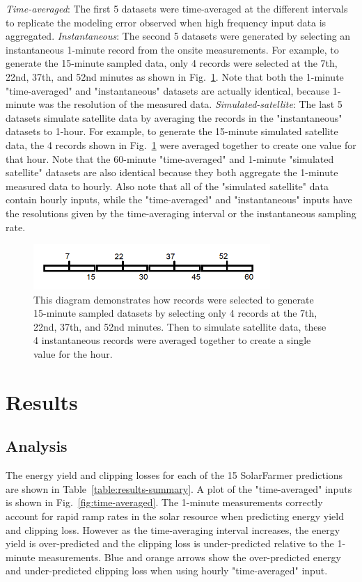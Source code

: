 \documentclass[conference]{IEEEtran}
\begin{document}
\emph{Time-averaged}: The first 5 datasets were time-averaged at the different intervals to replicate the modeling error observed when high frequency input data is aggregated. \emph{Instantaneous}: The second 5 datasets were generated by selecting an instantaneous 1-minute record from the onsite measurements. For example, to generate the 15-minute sampled data, only 4 records were selected at the 7th, 22nd, 37th, and 52nd minutes as shown in Fig.~\ref{fig:sampling-diagram}. Note that both the 1-minute "time-averaged" and "instantaneous" datasets are actually identical, because 1-minute was the resolution of the measured data. \emph{Simulated-satellite}: The last 5 datasets simulate satellite data by averaging the records in the "instantaneous" datasets to 1-hour. For example, to generate the 15-minute simulated satellite data, the 4 records shown in Fig.~\ref{fig:sampling-diagram} were averaged together to create one value for that hour. Note that the 60-minute "time-averaged" and 1-minute "simulated satellite" datasets are also identical because they both aggregate the 1-minute measured data to hourly. Also note that all of the "simulated satellite" data contain hourly inputs, while the "time-averaged" and "instantaneous" inputs have the resolutions given by the time-averaging interval or the instantaneous sampling rate.

\begin{figure}[htbp]
\centerline{\includegraphics[width=9cm]{sampling-diagram.png}}
\caption{This diagram demonstrates how records were selected to generate 15-minute sampled datasets by selecting only 4 records at the 7th, 22nd, 37th, and 52nd minutes. Then to simulate satellite data, these 4 instantaneous records were averaged together to create a single value for the hour.}
\label{fig:sampling-diagram}
\end{figure}

\section{Results}
\label{section:results}

\subsection{Analysis}
The energy yield and clipping losses for each of the 15 SolarFarmer predictions are shown in Table~\ref{table:results-summary}. A plot of the "time-averaged" inputs is shown in Fig.~\ref{fig:time-averaged}. The 1-minute measurements correctly account for rapid ramp rates in the solar resource when predicting energy yield and clipping loss. However as the time-averaging interval increases, the energy yield is over-predicted and the clipping loss is under-predicted relative to the 1-minute measurements. Blue and orange arrows show the over-predicted energy and under-predicted clipping loss when using hourly "time-averaged" input.
\end{document}
